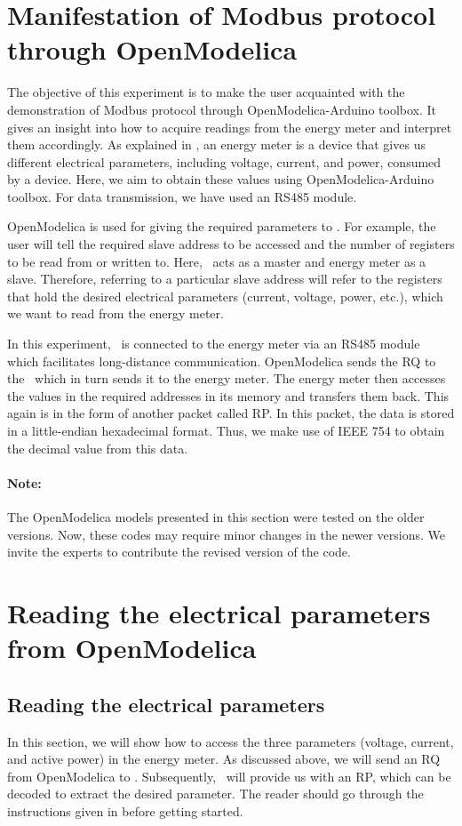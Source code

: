 
\section{Manifestation of Modbus protocol through OpenModelica}
The objective of this experiment is to make the user acquainted with
the demonstration of Modbus protocol through OpenModelica-Arduino toolbox.
It gives an insight into how to acquire readings from the energy meter and interpret them accordingly. As explained in ,
an energy meter is a device that gives us different electrical parameters, including voltage, current, and power, consumed by a device. Here, we aim to obtain these values using OpenModelica-Arduino toolbox. For data transmission, we have used an RS485 module.

OpenModelica is used for giving the required parameters to \arduino. For
example, the user will tell the required slave address to be accessed
and the number of registers to be read from or written to. Here,
\arduino\ acts as a master and energy meter as a slave. Therefore,
referring to a particular slave address will refer to the registers
that hold the desired electrical parameters (current, voltage, power, etc.), which we want to read from the energy meter.

In this experiment, \arduino\ is connected to the energy meter via an RS485 module which facilitates long-distance communication.
OpenModelica sends the RQ to the \arduino\, which in turn sends it to the
energy meter. The energy meter then accesses the values in the
required addresses in its memory and transfers them back. This again
is in the form of another packet called RP. In this packet, the data is stored in a little-endian hexadecimal format. Thus, we make use of IEEE 754 to obtain the decimal value from this data.

\paragraph{Note: } The OpenModelica models presented in this section were tested on the older versions. Now, these codes may require minor changes in
the newer versions. We invite the experts to contribute the revised version of the code.


\section{Reading the electrical parameters from OpenModelica}
\subsection{Reading the electrical parameters}
In this section, we will show how to access the three parameters (voltage, current, and active power) in the energy meter. As discussed above, we will send an RQ from OpenModelica to \arduino. Subsequently, \arduino\ will provide us with an RP, which can be decoded to extract the desired parameter. The reader should go through the instructions given in  before getting started.

